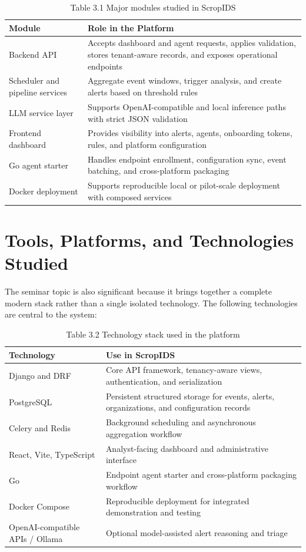 \documentclass[12pt,a4paper]{report}
\begin{document}
\begin{table}[H]
\centering
\caption{Table 3.1 Major modules studied in ScropIDS}
\begin{tabularx}{\textwidth}{>{\raggedright\arraybackslash}p{1.6in} X}
\toprule
\textbf{Module} & \textbf{Role in the Platform} \\
\midrule
Backend API & Accepts dashboard and agent requests, applies validation, stores tenant-aware records, and exposes operational endpoints \\
Scheduler and pipeline services & Aggregate event windows, trigger analysis, and create alerts based on threshold rules \\
LLM service layer & Supports OpenAI-compatible and local inference paths with strict JSON validation \\
Frontend dashboard & Provides visibility into alerts, agents, onboarding tokens, rules, and platform configuration \\
Go agent starter & Handles endpoint enrollment, configuration sync, event batching, and cross-platform packaging \\
Docker deployment & Supports reproducible local or pilot-scale deployment with composed services \\
\bottomrule
\end{tabularx}
\end{table}

\section{Tools, Platforms, and Technologies Studied}
The seminar topic is also significant because it brings together a complete modern stack rather than a single isolated technology. The following technologies are central to the system:

\begin{table}[H]
\centering
\caption{Table 3.2 Technology stack used in the platform}
\begin{tabularx}{\textwidth}{>{\raggedright\arraybackslash}p{1.6in} X}
\toprule
\textbf{Technology} & \textbf{Use in ScropIDS} \\
\midrule
Django and DRF & Core API framework, tenancy-aware views, authentication, and serialization \\
PostgreSQL & Persistent structured storage for events, alerts, organizations, and configuration records \\
Celery and Redis & Background scheduling and asynchronous aggregation workflow \\
React, Vite, TypeScript & Analyst-facing dashboard and administrative interface \\
Go & Endpoint agent starter and cross-platform packaging workflow \\
Docker Compose & Reproducible deployment for integrated demonstration and testing \\
OpenAI-compatible APIs / Ollama & Optional model-assisted alert reasoning and triage \\
\bottomrule
\end{tabularx}
\end{table}
\end{document}
